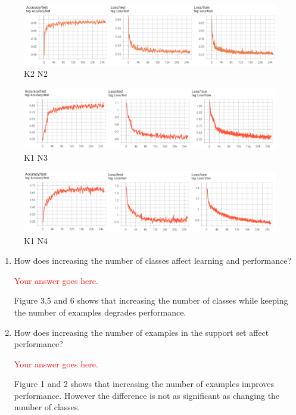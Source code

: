 \documentclass[12pt]{article}
\begin{document}
\begin{figure}[h]
    \centering
    \includegraphics[scale=1.5]{figures/report/k2_n2}
    \caption{K2 N2}
\end{figure}

\begin{figure}[h]
    \centering
    \includegraphics[scale=1.5]{figures/report/k1_n3}
    \caption{K1 N3}
\end{figure}

\begin{figure}[h]
    \centering
    \includegraphics[scale=1.5]{figures/report/k1_n4}
    \caption{K1 N4}
\end{figure}

\begin{enumerate}
    \item How does increasing the number of classes affect learning and performance?
    
    \textcolor{red}{Your answer goes here.}

    Figure 3,5 and 6 shows that increasing the number of classes while keeping the number of examples degrades performance.

    \item How does increasing the number of examples in the support set affect performance?
    
   \textcolor{red}{Your answer goes here.}

    Figure 1 and 2 shows that increasing the number of examples improves performance.
    However the difference is not as significant as changing the number of classes.

\end{enumerate}
\end{document}
